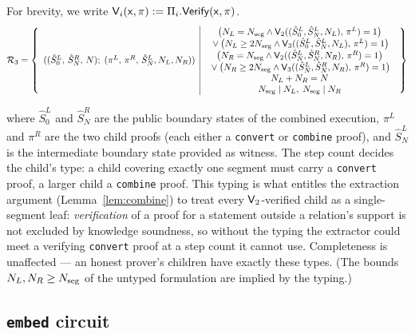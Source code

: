 For brevity, we write $\mathsf{V}_i(\mathsf{x},\pi):=\Pi_i.\mathsf{Verify}(\mathsf{x},\pi)$.
\begin{equation}\label{eq:rel-combine-typed}
  \scalebox{0.85}{$\displaystyle
  \relation_3=\left\lbrace\begin{array}{c|c}
   ((\hat{S}_0^L,\, \hat{S}_N^R,\, N);\; (\pi^L,\, \pi^R,\, \hat{S}_N^L, N_L, N_R)) &
    \begin{array}{c}
   \bigl(N_L = N_{\seg} \wedge \Vfy_2((\hat{S}_0^L, \hat{S}_N^L, N_L),\, \pi^L)=1\bigr) \\
   {}\lor \bigl(N_L \geq 2N_{\seg} \wedge \Vfy_3((\hat{S}_0^L, \hat{S}_N^L, N_L),\, \pi^L)=1\bigr) \\
   \bigl(N_R = N_{\seg} \wedge \Vfy_2((\hat{S}_N^L, \hat{S}_N^R, N_R),\, \pi^R)=1\bigr) \\
   {}\lor \bigl(N_R \geq 2N_{\seg} \wedge \Vfy_3((\hat{S}_N^L, \hat{S}_N^R, N_R),\, \pi^R)=1\bigr) \\
   N_L + N_R = N \\
   N_{\seg} \mid N_L,\; N_{\seg} \mid N_R
    \end{array}
  \end{array}\right\rbrace
  $}
\end{equation}

where $\hat{S}_0^L$ and $\hat{S}_N^R$ are the public boundary states of the combined execution,
$\pi^L$ and $\pi^R$ are the two child proofs (each either a \texttt{convert} or \texttt{combine} proof), and $\hat{S}_N^L$ is the intermediate boundary state provided as witness.
The step count decides the child's type: a child covering exactly one segment
must carry a \texttt{convert} proof, a larger child a \texttt{combine} proof.
This typing is what entitles the extraction argument
(Lemma~\ref{lem:combine}) to treat every $\mathsf{V}_2$-verified child as a
single-segment leaf: \emph{verification} of a proof for a statement outside a
relation's support is not excluded by knowledge soundness, so without the
typing the extractor could meet a verifying \texttt{convert} proof at a step
count it cannot use.  Completeness is unaffected --- an honest prover's
children have exactly these types.  (The bounds $N_L,N_R\ge N_{\mathrm{seg}}$ of the
untyped formulation are implied by the typing.)

\subsection{\texttt{embed} circuit}

